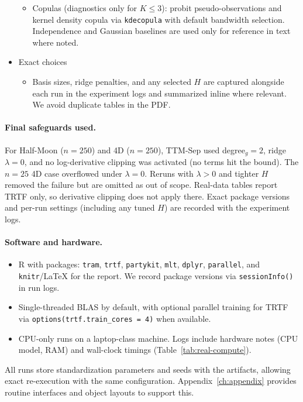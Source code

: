 \documentclass[11pt,a4paper,twoside]{book}\usepackage[]{graphicx}\usepackage[]{xcolor}
\begin{document}
\begin{itemize}
\begin{itemize}
      \item Copulas (diagnostics only for $K\le 3$): probit pseudo-observations and kernel density copula via \texttt{kdecopula} with default bandwidth selection. Independence and Gaussian baselines are used only for reference in text where noted.
    \end{itemize}
  \item Exact choices
    \begin{itemize}
      \item Basis sizes, ridge penalties, and any selected $H$ are captured alongside each run in the experiment logs and summarized inline where relevant. We avoid duplicate tables in the PDF.
    \end{itemize}
\end{itemize}

\paragraph{Final safeguards used.} For Half-Moon ($n=250$) and 4D ($n=250$), TTM-Sep used degree$_g=2$, ridge $\lambda=0$, and no log-derivative clipping was activated (no terms hit the bound). The $n=25$ 4D case overflowed under $\lambda=0$. Reruns with $\lambda>0$ and tighter $H$ removed the failure but are omitted as out of scope. Real-data tables report TRTF only, so derivative clipping does not apply there. Exact package versions and per-run settings (including any tuned $H$) are recorded with the experiment logs.

\paragraph{Software and hardware.}
\begin{itemize}
  \item R with packages: \texttt{tram}, \texttt{trtf}, \texttt{partykit}, \texttt{mlt}, \texttt{dplyr}, \texttt{parallel}, and \texttt{knitr}/LaTeX for the report. We record package versions via \texttt{sessionInfo()} in run logs.
  \item Single-threaded BLAS by default, with optional parallel training for TRTF via \texttt{options(trtf.train\_cores = 4)} when available.
  \item CPU-only runs on a laptop-class machine. Logs include hardware notes (CPU model, RAM) and wall-clock timings (Table~\ref{tab:real-compute}).
\end{itemize}

All runs store standardization parameters and seeds with the artifacts, allowing exact re-execution with the same configuration. Appendix~\ref{ch:appendix} provides routine interfaces and object layouts to support this.
\end{document}
